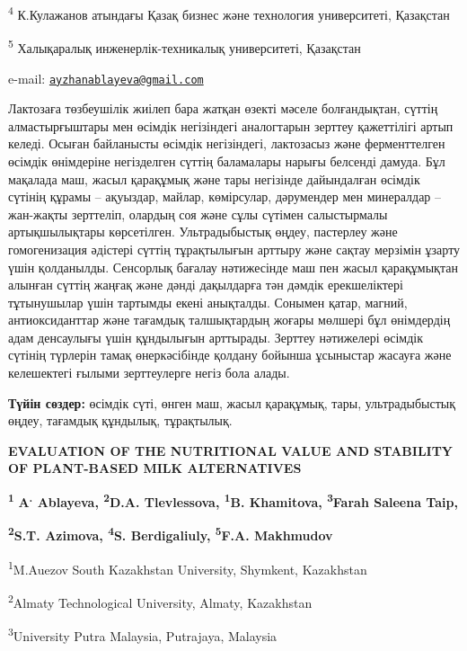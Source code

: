 \textsuperscript{4} К.Кулажанов атындағы Қазақ бизнес және технология
университеті, Қазақстан

\textsuperscript{5} Халықаралық инженерлік-техникалық университеті,
Қазақстан

e-mail:
\href{mailto:ayzhanablayeva@gmail.com}{\nolinkurl{ayzhanablayeva@gmail.com}}

Лактозаға төзбеушілік жиілеп бара жатқан өзекті мәселе болғандықтан,
сүттің алмастырғыштары мен өсімдік негізіндегі аналогтарын зерттеу
қажеттілігі артып келеді. Осыған байланысты өсімдік негізіндегі,
лактозасыз және ферменттелген өсімдік өнімдеріне негізделген сүттің
баламалары нарығы белсенді дамуда. Бұл мақалада маш, жасыл қарақұмық
және тары негізінде дайындалған өсімдік сүтінің құрамы -- ақуыздар,
майлар, көмірсулар, дәрумендер мен минералдар -- жан-жақты зерттеліп,
олардың соя және сұлы сүтімен салыстырмалы артықшылықтары көрсетілген.
Ультрадыбыстық өңдеу, пастерлеу және гомогенизация әдістері сүттің
тұрақтылығын арттыру және сақтау мерзімін ұзарту үшін қолданылды.
Сенсорлық бағалау нәтижесінде маш пен жасыл қарақұмықтан алынған сүттің
жаңғақ және дәнді дақылдарға тән дәмдік ерекшеліктері тұтынушылар үшін
тартымды екені анықталды. Сонымен қатар, магний, антиоксиданттар және
тағамдық талшықтардың жоғары мөлшері бұл өнімдердің адам денсаулығы үшін
құндылығын арттырады. Зерттеу нәтижелері өсімдік сүтінің түрлерін тамақ
өнеркәсібінде қолдану бойынша ұсыныстар жасауға және келешектегі ғылыми
зерттеулерге негіз бола алады.

{\bfseries Түйін сөздер:} өсімдік сүті, өнген маш, жасыл қарақұмық, тары,
ультрадыбыстық өңдеу, тағамдық құндылық, тұрақтылық.

{\bfseries EVALUATION OF THE NUTRITIONAL VALUE AND STABILITY OF PLANT-BASED
MILK ALTERNATIVES}

{\bfseries \textsuperscript{1}} {\bfseries A\textsuperscript{.}
Ablayeva\textsuperscript{\envelope }, \textsuperscript{2}D.A. Tlevlessova,
\textsuperscript{1}B. Khamitova, \textsuperscript{3}Farah Saleena Taip,}

{\bfseries \textsuperscript{2}S.T. Azimova, \textsuperscript{4}S.
Berdigaliuly, \textsuperscript{5}F.A. Makhmudov}

\textsuperscript{1}M.Auezov South Kazakhstan University, Shymkent,
Kazakhstan

\textsuperscript{2}Almaty Technological University, Almaty, Kazakhstan

\textsuperscript{3}University Putra Malaysia, Putrajaya, Malaysia


